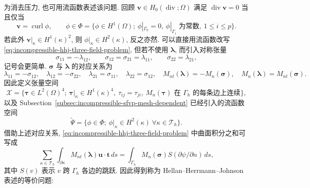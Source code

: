 为消去压力, 也可用流函数表述该问题.
回顾 $\mathbf v\in H_0(\operatorname{div};\Omega)$
满足 $\operatorname{div}\mathbf v=0$ 当且仅当
\[
\mathbf v=\operatorname{curl}\phi,
\qquad
\phi\in\Phi
=\{\phi\in H^1(\Omega);
\ \phi|_{\Gamma_0}=0,
\ \phi|_{\Gamma_i}\text{ 为常数},
\ 1\leq i\leq p\}.
\]
若此外 $\mathbf v|_\kappa\in H^1(\kappa)^2$,
则 $\phi|_\kappa\in H^2(\kappa)$, 反之亦然.
可以直接用流函数改写
\eqref{eq:incompressible-hhj-three-field-problem},
但若不使用 $\boldsymbol\lambda$, 而引入对称张量
\begin{equation}\label{eq:incompressible-hhj-symmetric-tensor}
\sigma_{11}=-\lambda_{12},
\qquad
\sigma_{12}=\sigma_{21}=\lambda_{11},
\qquad
\sigma_{22}=\lambda_{21},
\end{equation}
记号会更简单. $\boldsymbol\sigma$ 与
$\boldsymbol\lambda$ 的对应关系为
\begin{equation}\label{eq:incompressible-hhj-tensor-correspondence}
\lambda_{11}=-\sigma_{12},
\quad\lambda_{12}=-\sigma_{22},
\quad\lambda_{21}=\sigma_{11},
\quad\lambda_{22}=\sigma_{12},
\quad
M_{nt}(\boldsymbol\lambda)=-M_n(\boldsymbol\sigma),
\quad
M_n(\boldsymbol\lambda)=M_{nt}(\boldsymbol\sigma).
\end{equation}
因此定义张量空间
\begin{equation}\label{eq:incompressible-hhj-tensor-space}
\mathcal X
=\{\boldsymbol\tau\in L^2(\Omega)^4;
\ \boldsymbol\tau|_\kappa\in H^1(\kappa)^4,
\ \tau_{ij}=\tau_{ji},
\ M_n(\boldsymbol\tau)\text{ 在 }\Gamma_h\text{ 的每条边上连续}\},
\end{equation}
以及 Subsection~\ref{subsec:incompressible-sfvp-mesh-dependent}
已经引入的流函数空间
\begin{equation}\label{eq:incompressible-hhj-stream-space}
\widetilde\Psi
=\{\phi\in\Phi;
\ \phi|_\kappa\in H^2(\kappa)
\ \forall\kappa\in\mathcal T_h\}.
\end{equation}
借助上述对应关系,
\eqref{eq:incompressible-hhj-three-field-problem} 中曲面积分之和可写成
\[
\sum_{\kappa\in\mathcal T_h}
\int_{\partial\kappa}M_{nt}(\boldsymbol\lambda)
\mathbf u\cdot\mathbf t\,ds
=\int_{\Gamma_h}M_n(\boldsymbol\sigma)
S(\partial\psi/\partial n)\,ds,
\]
其中 $S(v)$ 表示 $v$ 跨 $\Gamma_h$ 各边的跳跃.
因此得到称为 Hellan--Herrmann--Johnson 表述的等价问题:

